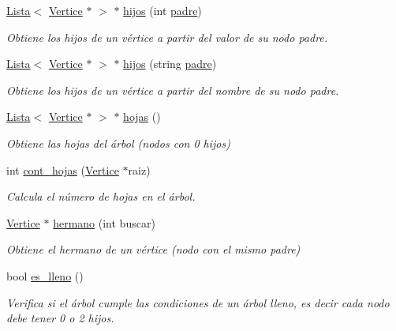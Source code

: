 \begin{DoxyCompactItemize}
\hyperlink{classLista}{Lista}$<$ \hyperlink{classVertice}{Vertice} $\ast$ $>$ $\ast$ \hyperlink{classArbol_ac2bfb4e9bab05342fb7d627fe3916183}{hijos} (int \hyperlink{classArbol_abcb8c26e9021a1418de71ad6014351cf}{padre})
\begin{DoxyCompactList}\small\item\em Obtiene los hijos de un vértice a partir del valor de su nodo padre. \end{DoxyCompactList}\item 
\hyperlink{classLista}{Lista}$<$ \hyperlink{classVertice}{Vertice} $\ast$ $>$ $\ast$ \hyperlink{classArbol_ac799e737e25e07d285d2bb29ba950b5c}{hijos} (string \hyperlink{classArbol_abcb8c26e9021a1418de71ad6014351cf}{padre})
\begin{DoxyCompactList}\small\item\em Obtiene los hijos de un vértice a partir del nombre de su nodo padre. \end{DoxyCompactList}\item 
\hyperlink{classLista}{Lista}$<$ \hyperlink{classVertice}{Vertice} $\ast$ $>$ $\ast$ \hyperlink{classArbol_a54203315682d5c39015ae7d871223b66}{hojas} ()
\begin{DoxyCompactList}\small\item\em Obtiene las hojas del árbol (nodos con 0 hijos) \end{DoxyCompactList}\item 
int \hyperlink{classArbol_aba59969b2a10294fb79e583a8e9471c5}{cont\+\_\+hojas} (\hyperlink{classVertice}{Vertice} $\ast$raiz)
\begin{DoxyCompactList}\small\item\em Calcula el número de hojas en el árbol. \end{DoxyCompactList}\item 
\hyperlink{classVertice}{Vertice} $\ast$ \hyperlink{classArbol_a59ae16f1a68c5e5afd08be20dcbf5717}{hermano} (int buscar)
\begin{DoxyCompactList}\small\item\em Obtiene el hermano de un vértice (nodo con el mismo padre) \end{DoxyCompactList}\item 
bool \hyperlink{classArbol_a14ccdbb79a82bf19a24449acaea6c413}{es\+\_\+lleno} ()
\begin{DoxyCompactList}\small\item\em Verifica si el árbol cumple las condiciones de un árbol lleno, es decir cada nodo debe tener 0 o 2 hijos. \end{DoxyCompactList}\item 

\end{DoxyCompactItemize}
